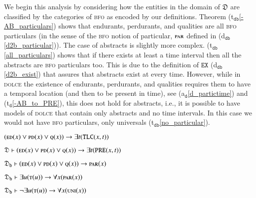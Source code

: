 \documentclass[ao]{iosart2x}
\newcommand{\nb}[1]{\textcolor{red}{$|$}\marginpar{\hspace*{-0cm}\parbox{20mm}{\scriptsize\raggedright\textcolor{red}{#1}}}}
\newcommand{\bflist}{\begin{list}{}{\setlength{\topsep}{2mm}\setlength{\parsep}{0mm}\setlength{\leftmargin}{9.2mm}\setlength{\labelwidth}{8mm}}}
\newcommand{\eflist}{\end{list}}
\newcommand{\dolceAxLabel}{\textrm{a$_\texttt{d}$}}
\newcommand{\dolceThrLabel}{\textrm{t$_\texttt{d}$}}
\newcommand{\dbDefLabel}{\textrm{d$_\texttt{db}$}}
\newcommand{\dbThrLabel}{\textrm{t$_\texttt{db}$}}
\newcounter{cntax}
\newcommand{\dolceax}[1]{\refstepcounter{cntax}\begin{small}{\bf \dolceAxLabel\thecntax\label{#1}}\end{small}}
\newcounter{cntthr}
\newcommand{\dolceth}[1]{\refstepcounter{cntthr}\begin{small}{\bf \dolceThrLabel\thecntthr\label{#1}}\end{small}}
\newcounter{cntdbth}
\newcommand{\dbth}[1]{\refstepcounter{cntdbth}\begin{small}{\bf \dbThrLabel\thecntdbth\label{#1}}\end{small}}
\newcommand{\refdolceax}[1]{({\dolceAxLabel}\ref{#1})}
\newcommand{\refdolceth}[1]{({\dolceThrLabel}\ref{#1})}
\newcommand{\refdbdf}[1]{({\dbDefLabel}\ref{#1})}
\newcommand{\refdbth}[1]{({\dbThrLabel}\ref{#1})}
\newcommand{\pr}[1]{\mathtt{#1}}
\newcommand{\dolce}{{\textsc{dolce}}}
\newcommand{\bfo}{{\textsc{bfo}}}
\newcommand {\thdolce} {\ensuremath{\mathfrak{D}}}
\newcommand {\thdolcedbmap} {\ensuremath{\mathfrak{D}_\texttt{b}}}
\newcommand {\EDdcat} {\textsc{ed}}
\newcommand {\PDdcat} {\textsc{pd}}
\newcommand {\Qdcat} {\textsc{q}}
\newcommand {\Tdcat} {\textsc{t}}
\newcommand {\PREd} {\ensuremath{\pr{PRE}}}
\newcommand {\TLCd} {\ensuremath{\pr{TLC}}}
\newcommand{\bfopartic}{\textsc{par}}
\newcommand{\bfouniv}{\textsc{uni}}
\newcommand{\bfoexist}{\pr{EX}}
\begin{document}
We begin this analysis by considering how the entities in the domain of $\thdolce$ are classified  by the categories of {\bfo} as encoded by our definitions. %
Theorem \refdbth{-AB_particulars} shows that endurants, perdurants, and qualities are all {\bfo} particulars (in the sense of the {\bfo} notion of particular, $\bfopartic$ defined in \refdbdf{d2b_particular}). The case of abstracts is slightly more complex. \refdbth{all_particulars} shows that if there exists at least a time interval then all the abstracts are {\bfo} particulars too. This is due to the definition of $\bfoexist$ \refdbdf{d2b_exist} that assures that abstracts exist at every time. However, while in {\dolce} the existence of endurants, perdurants, and qualities requires them to have a temporal location (and then to be present in time), see \refdolceax{d_partictime} and \refdolceth{-AB_to_PRE}, this does not hold for abstracts, i.e., it is possible to have models of {\dolce} that contain only abstracts and no time intervals. In this case we would not have {\bfo} particulars, only universals \refdbth{no_particular}.

\bflist
\item[\dolceax{d_partictime}] $(\EDdcat(x) \lor \PDdcat(x) \lor \Qdcat(x)) \to \exists t(\TLCd(x,t))$ 

\item[\dolceth{-AB_to_PRE}] $\thdolce \vdash (\EDdcat(x) \lor \PDdcat(x) \lor \Qdcat(x)) \to \exists t(\PREd(x,t))$

\item[\dbth{-AB_particulars}] $\thdolcedbmap \vdash (\EDdcat(x) \lor \PDdcat(x) \lor \Qdcat(x)) \to \bfopartic(x)$

\item[\dbth{all_particulars}] $\thdolcedbmap \vdash \exists u(\Tdcat(u)) \to \forall x(\bfopartic(x))$

\item[\dbth{no_particular}] $\thdolcedbmap \vdash \neg\exists u(\Tdcat(u)) \to \forall x(\bfouniv(x))$

\eflist
\end{document}
